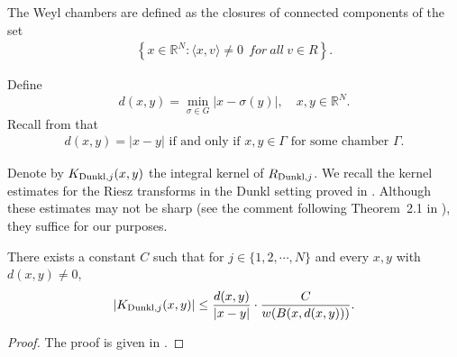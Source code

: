 \documentclass{amsart}
\numberwithin{equation}{section}
\begin{document}
\begin{definition}{\rm
The Weyl chambers are defined as the closures of connected components of the set
  \begin{align}
    \left\{x\in\mathbb{R}^N:\langle x,v\rangle \neq 0\ \ { for} \ { all} \ v\in R\right\}.\end{align}}
\end{definition}
Define
$$d(x,y)=\min_{\sigma\in G}|x-\sigma(y)|,\quad x,y\in\mathbb{R}^N.$$
Recall from \cite[Chapter VII, proof of Theorem 2.12]{MR514561} that
\begin{align}\label{distanceequa}
d(x,y)=|x-y|\mbox{ if and only if }x,y\in\Gamma\mbox{ for some chamber }\Gamma.
\end{align}



Denote by $K_{{\rm Dunkl},j}(x,y)$ the integral kernel of $R_{{\rm Dunkl},j}$. We recall the kernel estimates for the Riesz transforms in the Dunkl setting proved in \cite{MR4733961}. Although these estimates may not be sharp (see the comment following Theorem~2.1 in \cite[p.~10]{MR4733961}), they suffice for our purposes.
\begin{lemma}\label{kernelestimate}
There exists a constant $C$ such that for $j\in\{1,2,\cdots,N\}$ and every $x,y$ with $d(x,y)\neq 0,$
\begin{align*}
|K_{{\rm Dunkl},j}(x,y)|\leq \frac{d(x,y)}{|x-y|}\cdot\frac{C}{w(B(x,d(x,y)))}.
\end{align*}
\end{lemma}
\begin{proof}
The proof is given in \cite[Theorem 1.1]{MR4733961}.
\end{proof}
\end{document}
